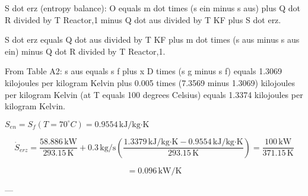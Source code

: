 S dot erz (entropy balance):  
O equals m dot times (s ein minus s aus) plus Q dot R divided by T Reactor,1 minus Q dot aus divided by T KF plus S dot erz.  

S dot erz equals Q dot aus divided by T KF plus m dot times (s aus minus s aus ein) minus Q dot R divided by T Reactor,1.  

From Table A2:  
s aus equals s f plus x D times (s g minus s f)  
equals 1.3069 kilojoules per kilogram Kelvin plus 0.005 times (7.3569 minus 1.3069) kilojoules per kilogram Kelvin  
(at T equals 100 degrees Celsius)  
equals 1.3374 kilojoules per kilogram Kelvin.

\( S_{en} = S_f (T = 70^\circ C) = 0.9554 \, \text{kJ/kg·K} \)  

\[
\dot{S}_{erz} = \frac{58.886 \, \text{kW}}{293.15 \, \text{K}} + 0.3 \, \text{kg/s} \left( \frac{1.3379 \, \text{kJ/kg·K} - 0.9554 \, \text{kJ/kg·K}}{293.15 \, \text{K}} \right) = \frac{100 \, \text{kW}}{371.15 \, \text{K}}
\]

\[
= 0.096 \, \text{kW/K}
\]

---